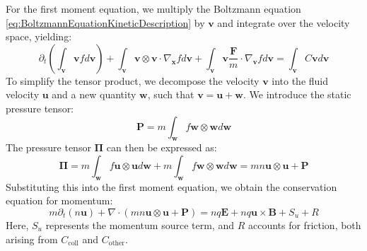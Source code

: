 For the first moment equation, we multiply the Boltzmann equation \ref{eq:BoltzmannEquationKineticDescription} by $\mathbf{v}$ and integrate over the velocity space, yielding:
\begin{equation}
	\partial_t \left( \int_\mathbf{v} \mathbf{v} f d\mathbf{v} \right) + \int_\mathbf{v} \mathbf{v} \otimes \mathbf{v} \cdot \nabla_{\mathbf{x}} f d\mathbf{v} + \int_\mathbf{v} \mathbf{v} \frac{\mathbf{F}}{m} \cdot \nabla_{\mathbf{v}} f d\mathbf{v} = \int_\mathbf{v} C \mathbf{v} d\mathbf{v}
\end{equation}
To simplify the tensor product, we decompose the velocity $\mathbf{v}$ into the fluid velocity $\mathbf{u}$ and a new quantity $\mathbf{w}$, such that $\mathbf{v} = \mathbf{u} + \mathbf{w}$. We introduce the static pressure tensor:
\begin{equation}
	\boldsymbol{P} = m \int_\mathbf{w} f \mathbf{w} \otimes \mathbf{w} d\mathbf{w}
\end{equation}
The pressure tensor $\boldsymbol{\Pi}$ can then be expressed as:
\begin{equation}
	\boldsymbol{\Pi} = m \int_\mathbf{w} f \mathbf{u} \otimes \mathbf{u} d\mathbf{w} + m \int_\mathbf{w} f \mathbf{w} \otimes \mathbf{w} d\mathbf{w} = mn \mathbf{u} \otimes \mathbf{u} + \boldsymbol{P}
\end{equation}
Substituting this into the first moment equation, we obtain the conservation equation for momentum:
\begin{equation}
	\label{eq:FirstMomentTransportEquation}
	m \partial_t (n \mathbf{u}) + \nabla \cdot \left( mn \mathbf{u} \otimes \mathbf{u} + \boldsymbol{P} \right) = nq \mathbf{E} + nq \mathbf{u} \times \mathbf{B} + S_u + R
\end{equation}
Here, $S_u$ represents the momentum source term, and $R$ accounts for friction, both arising from $C_{\text{coll}}$ and $C_{\text{other}}$.

